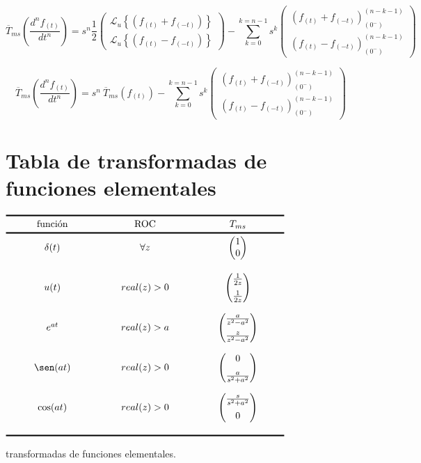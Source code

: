 \documentclass[12pt]{article}
\begin{document}
$$\overline{T}_{ms}\left(\frac{d^n f_{(t)}}{dt^n}\right) =s^n \frac12
\begin{pmatrix}
\mathcal{L}_u\left\{(f_{(t)} + f_{(-t)})\right\} \\[0.5 cm]
\mathcal{L}_u\left\{(f_{(t)} - f_{(-t)})\right\} 
\end{pmatrix}
- \sum\limits_{k=0}^{k=n-1} s^k
\begin{pmatrix}
 (f_{(t)} + f_{(-t)})^{(n-k-1)}_{(0^-)}\\[0.5 cm]
 (f_{(t)} - f_{(-t)})^{(n-k-1)}_{(0^-)}
\end{pmatrix}
$$

$$\overline{T}_{ms}\left(\frac{d^n f_{(t)}}{dt^n}\right) =s^n\  \overline{T}_{ms}(f_{(t)})
- \sum\limits_{k=0}^{k=n-1} s^k
\begin{pmatrix}
 (f_{(t)} + f_{(-t)})^{(n-k-1)}_{(0^-)}\\[0.5 cm]
 (f_{(t)} - f_{(-t)})^{(n-k-1)}_{(0^-)}
\end{pmatrix}
$$
\newpage
\section{Tabla de transformadas de funciones elementales}
\begin{table}[h!]
\centering
$\begin{array}{ ccc }
\toprule[0.05cm]
\makebox[3 cm]{\text{función}} & \makebox[3 cm]{\text{ROC}} & \makebox[3 cm]{$T_{ms}$} \\
\midrule[0.05cm]
\delta(t) & \forall z & \begin{pmatrix}1\\0\end{pmatrix}\\[0.7 cm]
u(t) & real(z) > 0 &  \begin{pmatrix}\frac{1}{2z}\\[0.2 cm]\frac{1}{2z}\end{pmatrix}\\[0.7cm]
e^{at} &real(z) > a & \begin{pmatrix}\frac{a}{z^2-a^2}\\[0.2 cm]\frac{z}{z^2-a^2}\end{pmatrix}\\[0.7cm]
\sen(at) & real(z) > 0 &  \begin{pmatrix}0\\[0.2 cm]\frac{a}{s^2+a^2}\end{pmatrix}\\[0.7cm]
\cos(at) & real(z) > 0 &  \begin{pmatrix}\frac{s}{s^2+a^2}\\[0.2 cm]0\end{pmatrix}\\[0.7cm]

\bottomrule[0.05cm]
\end{array}$
\caption{transformadas de funciones elementales.}
\end{table}
\end{document}

